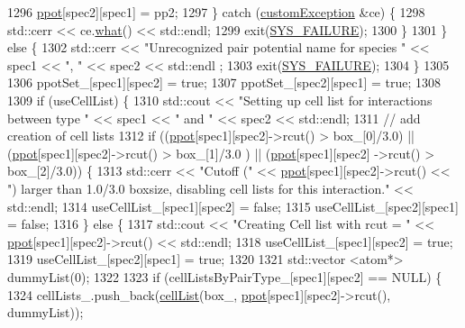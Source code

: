 \begin{DoxyCode}
1296             \hyperlink{classsim_system_ad2e290b5963f132e6a3a56cee35c8e9f}{ppot}[spec2][spec1] = pp2;
1297         \} \textcolor{keywordflow}{catch} (\hyperlink{classcustom_exception}{customException} &ce) \{
1298             std::cerr << ce.\hyperlink{classcustom_exception_aeb6ab5848b038adfc68fde86a512f691}{what}() << std::endl;
1299             exit(\hyperlink{global_8h_a428dfe1ef0a6ff4b1fdebf275f6aff2e}{SYS\_FAILURE});
1300         \}
1301     \} \textcolor{keywordflow}{else} \{
1302         std::cerr << \textcolor{stringliteral}{"Unrecognized pair potential name for species "} << spec1 << \textcolor{stringliteral}{", "} << spec2 << std::endl
      ;
1303         exit(\hyperlink{global_8h_a428dfe1ef0a6ff4b1fdebf275f6aff2e}{SYS\_FAILURE});
1304     \}
1305 
1306     ppotSet\_[spec1][spec2] = \textcolor{keyword}{true};
1307     ppotSet\_[spec2][spec1] = \textcolor{keyword}{true};
1308 
1309     \textcolor{keywordflow}{if} (useCellList) \{
1310         std::cout << \textcolor{stringliteral}{"Setting up cell list for interactions between type "} << spec1 << \textcolor{stringliteral}{" and "} << spec2 << 
      std::endl;
1311         \textcolor{comment}{// add creation of cell lists}
1312         \textcolor{keywordflow}{if} ((\hyperlink{classsim_system_ad2e290b5963f132e6a3a56cee35c8e9f}{ppot}[spec1][spec2]->rcut() > box\_[0]/3.0) || (\hyperlink{classsim_system_ad2e290b5963f132e6a3a56cee35c8e9f}{ppot}[spec1][spec2]->rcut() > box\_[1]/3.0
      ) || (\hyperlink{classsim_system_ad2e290b5963f132e6a3a56cee35c8e9f}{ppot}[spec1][spec2] ->rcut() > box\_[2]/3.0)) \{
1313             std::cerr << \textcolor{stringliteral}{"Cutoff ("} << \hyperlink{classsim_system_ad2e290b5963f132e6a3a56cee35c8e9f}{ppot}[spec1][spec2]->rcut() << \textcolor{stringliteral}{") larger than 1.0/3.0 boxsize,
       disabling cell lists for this interaction."} << std::endl;
1314             useCellList\_[spec1][spec2] = \textcolor{keyword}{false};
1315             useCellList\_[spec2][spec1] = \textcolor{keyword}{false};
1316         \} \textcolor{keywordflow}{else} \{
1317             std::cout << \textcolor{stringliteral}{"Creating Cell list with rcut = "} << \hyperlink{classsim_system_ad2e290b5963f132e6a3a56cee35c8e9f}{ppot}[spec1][spec2]->rcut() << std::endl;
1318             useCellList\_[spec1][spec2] = \textcolor{keyword}{true};
1319             useCellList\_[spec2][spec1] = \textcolor{keyword}{true};
1320 
1321             std::vector <atom*> dummyList(0);
1322 
1323             \textcolor{keywordflow}{if} (cellListsByPairType\_[spec1][spec2] == NULL) \{
1324                 cellLists\_.push\_back(\hyperlink{classcell_list}{cellList}(box\_, \hyperlink{classsim_system_ad2e290b5963f132e6a3a56cee35c8e9f}{ppot}[spec1][spec2]->rcut(), dummyList));

\end{DoxyCode}
